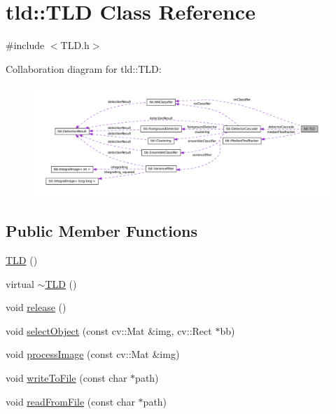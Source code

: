 \hypertarget{classtld_1_1_t_l_d}{
\section{tld::TLD Class Reference}
\label{classtld_1_1_t_l_d}
}


{\ttfamily \#include $<$TLD.h$>$}



Collaboration diagram for tld::TLD:
\nopagebreak
\begin{figure}[H]
\begin{center}
\leavevmode
\includegraphics[width=400pt]{classtld_1_1_t_l_d__coll__graph}
\end{center}
\end{figure}
\subsection*{Public Member Functions}
\begin{DoxyCompactItemize}
\item 
\hyperlink{classtld_1_1_t_l_d_a7dd24a107de7e84f9b0459c3bfa078aa}{TLD} ()
\item 
virtual \hyperlink{classtld_1_1_t_l_d_a0bd3497a3d97108b74a107ead3b716f5}{$\sim$TLD} ()
\item 
void \hyperlink{classtld_1_1_t_l_d_a42636c4a6fef7de9b71af987151a7f9e}{release} ()
\item 
void \hyperlink{classtld_1_1_t_l_d_a6a1b9edb0ae0f79d4447c2ff7ab983be}{selectObject} (const cv::Mat \&img, cv::Rect $\ast$bb)
\item 
void \hyperlink{classtld_1_1_t_l_d_a8161e09603dc40c43d314cfec9e0746b}{processImage} (const cv::Mat \&img)
\item 
void \hyperlink{classtld_1_1_t_l_d_aef7e6414e0334f8d4325360bd4ea3048}{writeToFile} (const char $\ast$path)
\item 
void \hyperlink{classtld_1_1_t_l_d_a8474094a32dc39751bac54f8998860c5}{readFromFile} (const char $\ast$path)
\end{DoxyCompactItemize}
